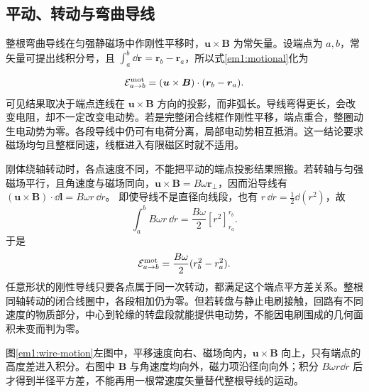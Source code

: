\subsection{平动、转动与弯曲导线}
整根弯曲导线在匀强静磁场中作刚性平移时，$\bm u\times\bm B$ 为常矢量。设端点为 $a,b$，常矢量可提出线积分号，且 $\int_a^b\dd\bm r=\bm r_b-\bm r_a$，所以式\eqref{em1:motional}化为

\[\mathcal E_{a\to b}^{\rm mot}=(\bm u\times\bm B)\cdot(\bm r_b-\bm r_a).\]
可见结果取决于端点连线在 $\bm u\times\bm B$ 方向的投影，而非弧长。导线弯得更长，会改变电阻，却不一定改变电动势。若是完整闭合线框作刚性平移，端点重合，整圈动生电动势为零。各段导线中仍可有电荷分离，局部电动势相互抵消。这一结论要求磁场均匀且整框同速，线框进入有限磁区时就不适用。


刚体绕轴转动时，各点速度不同，不能把平动的端点投影结果照搬。若转轴与匀强磁场平行，且角速度与磁场同向，$\bm u\times\bm B=B\omega\bm r_\perp$，因而沿导线有
$(\bm u\times\bm B)\cdot\dd\bm l=B\omega r\,\dd r$。
即使导线不是直径向线段，也有
$r\,\dd r=\tfrac12\dd(r^2)$，故
\[
\int_a^bB\omega r\,\dd r
=\frac{B\omega}{2}[r^2]_{r_a}^{r_b}.
\]
于是
\[\mathcal E_{a\to b}^{\rm mot}=\frac{B\omega}{2}(r_b^2-r_a^2).\]
任意形状的刚性导线只要各点属于同一次转动，都满足这个端点平方差关系。整根同轴转动的闭合线圈中，各段相加仍为零。但若转盘与静止电刷接触，回路有不同速度的物质部分，中心到轮缘的转盘段就能提供电动势，不能因电刷围成的几何面积未变而判为零。


图\ref{em1:wire-motion}左图中，平移速度向右、磁场向内，$\bm u\times\bm B$ 向上，只有端点的高度差进入积分。右图中 $\bm B$ 与角速度均向外，磁力项沿径向向外；积分 $B\omega r\dd r$ 后才得到半径平方差，不能再用一根常速度矢量替代整根导线的运动。



